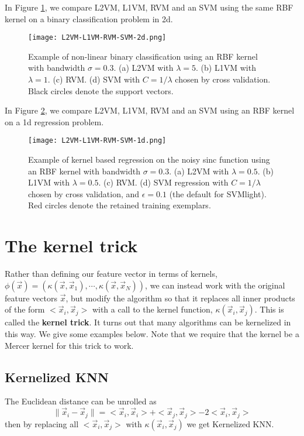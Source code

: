 In Figure \ref{fig:L2VM-L1VM-RVM-SVM-2d}, we compare L2VM, L1VM, RVM and an SVM using the same RBF kernel on a binary classification problem in 2d.

\begin{figure}[hbtp]
\centering
    \texttt{[image: L2VM-L1VM-RVM-SVM-2d.png]}
\caption{Example of non-linear binary classification using an RBF kernel with bandwidth $\sigma=0.3$. (a) L2VM with $\lambda=5$. (b) L1VM with $\lambda=1$. (c) RVM. (d) SVM with $C=1/\lambda$ chosen by cross validation. Black circles denote the support vectors.}
\label{fig:L2VM-L1VM-RVM-SVM-2d} 
\end{figure}

In Figure \ref{fig:L2VM-L1VM-RVM-SVM-1d}, we compare L2VM, L1VM, RVM and an SVM using an RBF kernel on a 1d regression problem. 
\begin{figure}[hbtp]
\centering
    \texttt{[image: L2VM-L1VM-RVM-SVM-1d.png]}
\caption{Example of kernel based regression on the noisy sinc function using an RBF kernel with bandwidth $\sigma=0.3$. (a) L2VM with $\lambda=0.5$. (b) L1VM with $\lambda=0.5$. (c) RVM. (d) SVM regression with $C=1/\lambda$ chosen by cross validation, and $\epsilon=0.1$ (the default for SVMlight). Red circles denote the retained training exemplars.}
\label{fig:L2VM-L1VM-RVM-SVM-1d} 
\end{figure}


\section{The kernel trick}
Rather than defining our feature vector in terms of kernels, $\phi(\vec{x})=(\kappa(\vec{x},\vec{x}_1),\cdots,\kappa(\vec{x},\vec{x}_N))$, we can instead work with the original feature vectors $\vec{x}$, but modify the algorithm so that it replaces all inner products of the form $<\vec{x}_i,\vec{x}_j>$ with a call to the kernel function, $\kappa(\vec{x}_i,\vec{x}_j)$. This is called the \textbf{kernel trick}. It turns out that many algorithms can be kernelized in this way. We give some examples below. Note that we require that the kernel be a Mercer kernel for this trick to work.


\subsection{Kernelized KNN}
The Euclidean distance can be unrolled as
\begin{equation}\label{eqn:Euclidean-distance}
\lVert\vec{x}_i-\vec{x}_j\rVert=<\vec{x}_i,\vec{x}_i>+<\vec{x}_j,\vec{x}_j>-2<\vec{x}_i,\vec{x}_j>
\end{equation}
then by replacing all $<\vec{x}_i,\vec{x}_j>$ with $\kappa(\vec{x}_i,\vec{x}_j)$ we get Kernelized KNN.


